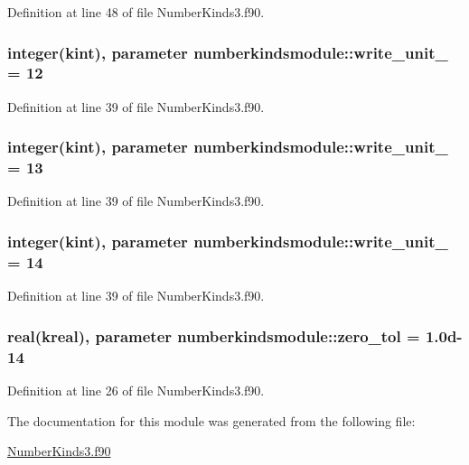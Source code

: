 Definition at line 48 of file Number\+Kinds3.\+f90.

\hypertarget{classnumberkindsmodule_a761d497049d5f7ead78a5088ec7ba6a2}{
\subsubsection[{write\+\_\+unit\+\_\+1}]{\setlength{\rightskip}{0pt plus 5cm}integer({\bf kint}), parameter numberkindsmodule\+::write\+\_\+unit\+\_ = 12}}\label{classnumberkindsmodule_a761d497049d5f7ead78a5088ec7ba6a2}


Definition at line 39 of file Number\+Kinds3.\+f90.

\hypertarget{classnumberkindsmodule_a9b3dadbfd9070ddcc5614a70b8b175fb}{
\subsubsection[{write\+\_\+unit\+\_\+2}]{\setlength{\rightskip}{0pt plus 5cm}integer({\bf kint}), parameter numberkindsmodule\+::write\+\_\+unit\+\_ = 13}}\label{classnumberkindsmodule_a9b3dadbfd9070ddcc5614a70b8b175fb}


Definition at line 39 of file Number\+Kinds3.\+f90.

\hypertarget{classnumberkindsmodule_aaed367cd86772cc92f06046eba31864e}{
\subsubsection[{write\+\_\+unit\+\_\+3}]{\setlength{\rightskip}{0pt plus 5cm}integer({\bf kint}), parameter numberkindsmodule\+::write\+\_\+unit\+\_ = 14}}\label{classnumberkindsmodule_aaed367cd86772cc92f06046eba31864e}


Definition at line 39 of file Number\+Kinds3.\+f90.

\hypertarget{classnumberkindsmodule_a55d20f06f159cd32c956d990e1e8d09b}{
\subsubsection[{zero\+\_\+tol}]{\setlength{\rightskip}{0pt plus 5cm}real({\bf kreal}), parameter numberkindsmodule\+::zero\+\_\+tol = 1.\+0d-\/14}}\label{classnumberkindsmodule_a55d20f06f159cd32c956d990e1e8d09b}


Definition at line 26 of file Number\+Kinds3.\+f90.



The documentation for this module was generated from the following file\+:\begin{DoxyCompactItemize}
\item 
\hyperlink{NumberKinds3_8f90}{Number\+Kinds3.\+f90}\end{DoxyCompactItemize}
